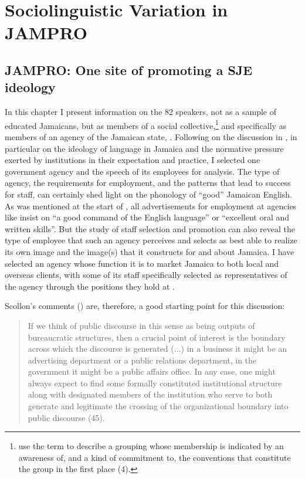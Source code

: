 \chapter{Sociolinguistic Variation in JAMPRO}\label{ch:4}
\section{JAMPRO: One site of promoting a SJE ideology}\label{sec:4.1}

In this chapter I present information on the 82 speakers, not as a sample of educated Jamaicans, but as members of a social collective,\footnote{\citet{Sealey2001} use the term to describe a grouping whose membership is indicated by an awareness of, and a kind of commitment to, the conventions that constitute the group in the first place (4).} and specifically as members of an agency of the Jamaican state, .  Following on the discussion in , in particular on the ideology of language in Jamaica and the normative pressure exerted by institutions in their expectation and practice, I selected one government agency and the speech of its employees for analysis.  The type of agency, the requirements for employment, and the patterns that lead to success for staff, can certainly shed light on the phonology of “good” Jamaican English.  As was mentioned at the start of , all advertisements for employment at agencies like  insist on “a good command of the English language” or “excellent oral and written skills”.  But the study of staff selection and promotion can also reveal the type of employee that such an agency perceives and selects as best able to realize its own image and the image(s) that it constructs for and about Jamaica.  I have selected an agency whose function it is to market Jamaica to both local and overseas clients, with some of its staff specifically selected as representatives of the agency through the positions they hold at .  

Scollon’s comments (\citeyear{Scollon1997}) are, therefore, a good starting point for this discussion:

\begin{quote} If we think of public discourse in this sense as being outputs of bureaucratic structures, then a crucial point of interest is the boundary across which the discourse is generated (...) in a business it might be an advertising department or a public relations department, in the government it might be a public affairs office.  In any case, one might always expect to find some formally constituted institutional structure along with designated members of the institution who serve to both generate and legitimate the crossing of the organizational boundary into public discourse (45).\end{quote}

